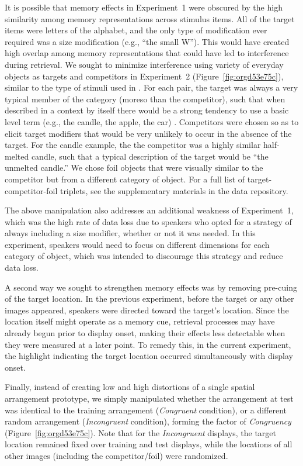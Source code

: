 \documentclass[natbib,doc,a4paper]{apa6}
\begin{document}
It is possible that memory effects in Experiment~1 were obscured by the high similarity among memory representations across stimulus items. All of the target items were letters of the alphabet, and the only type of modification ever required was a size modification (e.g., ``the small W''). This would have created high overlap among memory representations that could have led to interference during retrieval. We sought to minimize interference using variety of everyday objects as targets and competitors in Experiment~2 (Figure~\ref{fig:orgd53e75c}), similar to the type of stimuli used in \cite{GannBarr2014}. For each pair, the target was always a very typical member of the category (moreso than the competitor), such that when described in a context by itself there would be a strong tendency to use a basic level term (e.g., the candle, the apple, the car) \citep{roschetal76}. Competitors were chosen so as to elicit target modifiers that would be very unlikely to occur in the absence of the target. For the candle example, the the competitor was a highly similar half-melted candle, such that a typical description of the target would be ``the unmelted candle.''  We chose foil objects that were visually similar to the competitor but from a different category of object. For a full list of target-competitor-foil triplets, see the supplementary materials in the data repository.

The above manipulation also addresses an additional weakness of Experiment~1, which was the high rate of data loss due to speakers who opted for a strategy of always including a size modifier, whether or not it was needed. In this experiment, speakers would need to focus on different dimensions for each category of object, which was intended to discourage this strategy and reduce data loss.

A second way we sought to strengthen memory effects was by removing pre-cuing of the target location. In the previous experiment, before the target or any other images appeared, speakers were directed toward the target's location. Since the location itself might operate as a memory cue, retrieval processes may have already begun prior to display onset, making their effects less detectable when they were measured at a later point.  To remedy this, in the current experiment, the highlight indicating the target location occurred simultaneously with display onset.

Finally, instead of creating low and high distortions of a single spatial arrangement prototype, we simply manipulated whether the arrangement at test was identical to the training arrangement (\emph{Congruent} condition), or a different random arrangement (\emph{Incongruent} condition), forming the factor of \emph{Congruency} (Figure~\ref{fig:orgd53e75c}). Note that for the \emph{Incongruent} displays, the target location remained fixed over training and test displays, while the locations of all other images (including the competitor/foil) were randomized.
\end{document}
